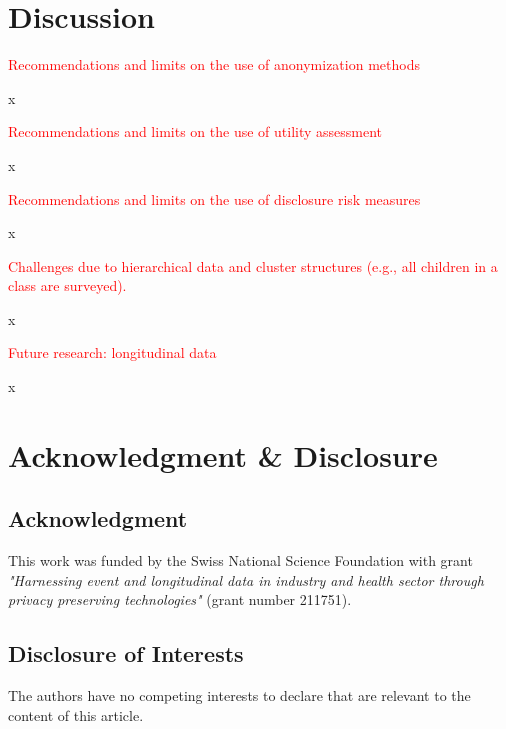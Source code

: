 \documentclass{article}
\begin{document}
\section{Discussion}

\textcolor{red}{Recommendations and limits on the use of anonymization methods}
   
x

\textcolor{red}{Recommendations and limits on the use of utility assessment}

x

\textcolor{red}{Recommendations and limits on the use of disclosure risk measures}

x

\textcolor{red}{Challenges due to hierarchical data and cluster structures (e.g., all children in a class are surveyed).}

x

\textcolor{red}{Future research: longitudinal data}

x

\section*{Acknowledgment \& Disclosure} 
\subsection*{Acknowledgment} 
This work was funded by the Swiss National Science Foundation with grant \textit{"Harnessing event and longitudinal data in industry and health sector through privacy preserving technologies"} (grant number 211751).

\subsection*{Disclosure of Interests} 
The authors have no competing interests to declare that are relevant to the content of this article. 




\end{document}

